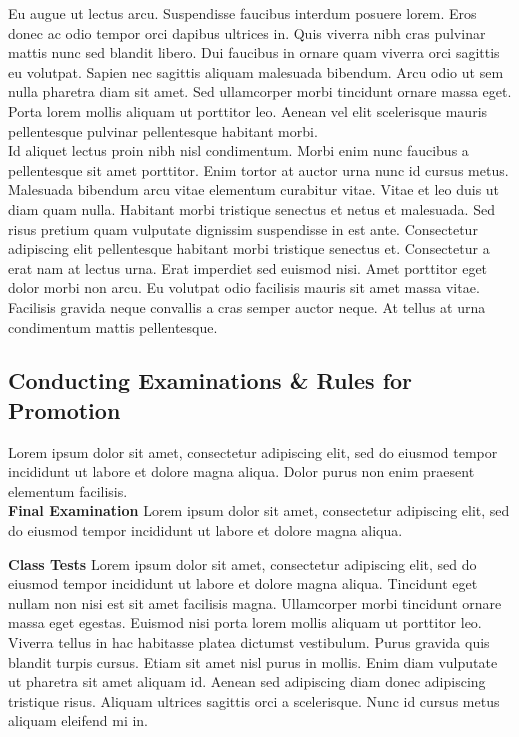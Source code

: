 \documentclass{article}
\begin{document}
Eu augue ut lectus arcu. Suspendisse faucibus interdum posuere lorem. Eros donec ac odio tempor orci dapibus ultrices in. Quis viverra nibh cras pulvinar mattis nunc sed blandit libero. Dui faucibus in ornare quam viverra orci sagittis eu volutpat. Sapien nec sagittis aliquam malesuada bibendum. Arcu odio ut sem nulla pharetra diam sit amet. Sed ullamcorper morbi tincidunt ornare massa eget. Porta lorem mollis aliquam ut porttitor leo. Aenean vel elit scelerisque mauris pellentesque pulvinar pellentesque habitant morbi.\\

Id aliquet lectus proin nibh nisl condimentum. Morbi enim nunc faucibus a pellentesque sit amet porttitor. Enim tortor at auctor urna nunc id cursus metus. Malesuada bibendum arcu vitae elementum curabitur vitae. Vitae et leo duis ut diam quam nulla. Habitant morbi tristique senectus et netus et malesuada. Sed risus pretium quam vulputate dignissim suspendisse in est ante. Consectetur adipiscing elit pellentesque habitant morbi tristique senectus et. Consectetur a erat nam at lectus urna. Erat imperdiet sed euismod nisi. Amet porttitor eget dolor morbi non arcu. Eu volutpat odio facilisis mauris sit amet massa vitae. Facilisis gravida neque convallis a cras semper auctor neque. At tellus at urna condimentum mattis pellentesque.\\
\subsection{Conducting Examinations \& Rules for Promotion}
Lorem ipsum dolor sit amet, consectetur adipiscing elit, sed do eiusmod tempor incididunt ut labore et dolore magna aliqua. Dolor purus non enim praesent elementum facilisis.\\
\textbf{Final Examination} Lorem ipsum dolor sit amet, consectetur adipiscing elit, sed do eiusmod tempor incididunt ut labore et dolore magna aliqua.

\vspace{5mm}

\textbf{Class Tests} Lorem ipsum dolor sit amet, consectetur adipiscing elit, sed do eiusmod tempor incididunt ut labore et dolore magna aliqua. Tincidunt eget nullam non nisi est sit amet facilisis magna. Ullamcorper morbi tincidunt ornare massa eget egestas. Euismod nisi porta lorem mollis aliquam ut porttitor leo. Viverra tellus in hac habitasse platea dictumst vestibulum. Purus gravida quis blandit turpis cursus. Etiam sit amet nisl purus in mollis. Enim diam vulputate ut pharetra sit amet aliquam id. Aenean sed adipiscing diam donec adipiscing tristique risus. Aliquam ultrices sagittis orci a scelerisque. Nunc id cursus metus aliquam eleifend mi in.\\
\end{document}
